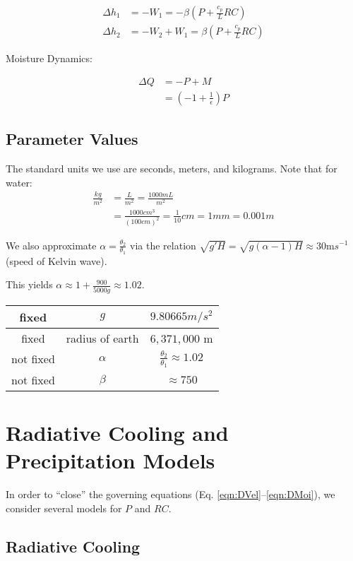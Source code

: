 \documentclass[10pt]{article}
\begin{document}
\begin{align}
\Delta h_1 &= -W_1 = -\beta \left(P + \frac{c_p}{L}RC\right)\\
\Delta h_2 &= -W_2 + W_1 = \beta \left(P + \frac{c_p}{L}RC\right)
\label{eqn:DHei}
\end{align}

Moisture Dynamics:

\begin{align}
\Delta Q &= -P + M\\
&= \left(-1 + \frac{1}{\epsilon} \right)P
\label{eqn:DMoi}
\end{align}

\subsection{Parameter Values}
The standard units we use are seconds, meters, and kilograms. Note that for water:
\begin{align*}
\frac{kg}{m^2} &= \frac{L}{m^2} = \frac{1000 mL}{m^2}\\
&= \frac{1000 cm^3}{ (100cm)^2} = \frac{1}{10} cm = 1 mm = 0.001 m 
\end{align*}

We also approximate $\alpha = \frac{\theta_2}{\theta_1}$ via the relation $\sqrt{g'H} = \sqrt{g(\alpha -1) H} \approx 30 $m$s^{-1}$ (speed of Kelvin wave).

This yields $\alpha \approx 1+\frac{900}{5000g} \approx 1.02$.


\begin{center}
	\begin{tabular}{||c |c|c|| } 
		\hline
		fixed & $g$  & $9.80665 m/s^2$ \\  \hline
		fixed & radius of earth & $6,371,000$ m \\ \hline
		not fixed & $\alpha$  & $\frac{\theta_2}{\theta_1}\approx 1.02$ \\ \hline
		not fixed & $\beta$ &  $\approx 750$ \\ \hline
	\end{tabular}
\end{center}

\section{Radiative Cooling and Precipitation Models}
In order to ``close'' the governing equations (Eq. \ref{eqn:DVel}--\ref{eqn:DMoi}), we consider several models for $P$ and $RC$.

\subsection{Radiative Cooling}
\end{document}
